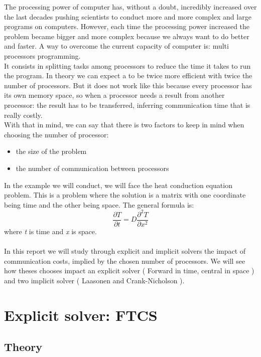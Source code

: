 \documentclass[12pt, a4paper]{report}
\begin{document}
The processing power of computer has, without a doubt, incredibly increased over the last decades pushing scientists to conduct more and more complex and large programs on computers. However, each time the processing power increased the problem became bigger and more complex because we always want to do better and faster. A way to overcome the current capacity of computer is: multi processors programming.\\ It consists in splitting tasks among processors to reduce the time it takes to run the program. In theory we can expect a to be twice more efficient with twice the number of processors. But it does not work like this because every processor has its own memory space, so when a processor needs a result from another processor: the result has to be transferred, inferring communication time that is really costly.\\
With that in mind, we can say that there is  two factors to keep in mind when choosing the number of processor:
\begin{itemize}
\item the size of the problem
\item the number of communication between processors
\end{itemize}

In the example we will conduct, we will face the heat conduction equation problem. This is a problem where the solution is a matrix with one coordinate being time and the other being space. The general formula is:\begin{equation}\frac{\partial T}{\partial t} = D\frac{\partial^2T }{\partial x^2}
\end{equation} 
where \textit{t} is time and \textit{x} is space.\\\\
In this report we will study through explicit and implicit solvers the impact of communication costs, implied by the chosen number of processors. We will see how theses chooses impact an explicit solver ( Forward in time, central in space ) and two implicit solver ( Laasonen and Crank-Nicholson ).
 


\chapter{Explicit solver: FTCS}
\section{Theory}
\end{document}
